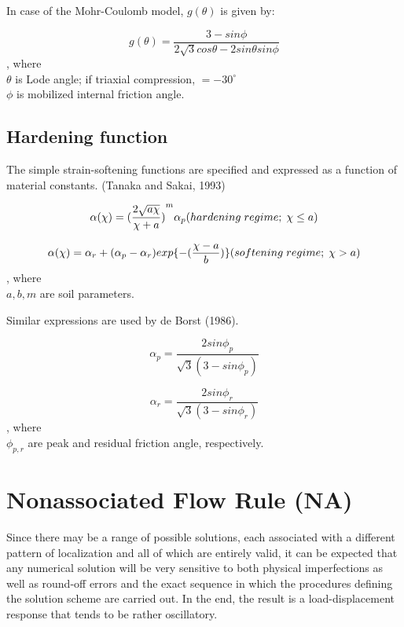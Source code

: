 \documentclass[a4paper, nobind]{templates/ociamthesis}
\begin{document}
In case of the Mohr-Coulomb model, \(g(\theta)\) is given by:

\[
  g(\theta) = \frac{3-sin\phi}{2\sqrt{3}cos\theta -2sin\theta sin\phi}
\]
, where\\
\(\theta\) is Lode angle; if triaxial compression, \(=-30 ^{\circ}\)\\
\(\phi\) is mobilized internal friction angle.

\hypertarget{hardening-function}{%
\subsection{Hardening function}\label{hardening-function}}

The simple strain-softening functions are specified and expressed as a function of material constants. (Tanaka and Sakai, 1993)

\[
\alpha(\chi) = {(\frac{2\sqrt{a\chi }}{\chi +a})}^m \alpha_p\; \\ (hardening \; regime;\; \chi \leq a) 
\]

\[
\alpha(\chi) = \alpha_r + (\alpha_p - \alpha_r) exp\{-(\frac{\chi-a}{b})\}\; \\ (softening \; regime;\; \chi > a) 
\]
, where\\
\(a, b, m\) are soil parameters.

Similar expressions are used by de Borst (1986).

\[
\alpha_p = \frac{2 sin \phi_p}{\sqrt{3}(3-sin\phi_p)}
\]

\[
\alpha_r = \frac{2 sin \phi_r}{\sqrt{3}(3-sin\phi_r)}
\]
, where\\
\(\phi_{p,r}\) are peak and residual friction angle, respectively.

\hypertarget{nonassociated-flow-rule-na}{%
\section{Nonassociated Flow Rule (NA)}\label{nonassociated-flow-rule-na}}

Since there may be a range of possible solutions, each associated with a different pattern of localization and all of which are entirely valid, it can be expected that any numerical solution will be very sensitive to both physical imperfections as well as round-off errors and the exact sequence in which the procedures defining the solution scheme are carried out. In the end, the result is a load-displacement response that tends to be rather oscillatory.
\end{document}
